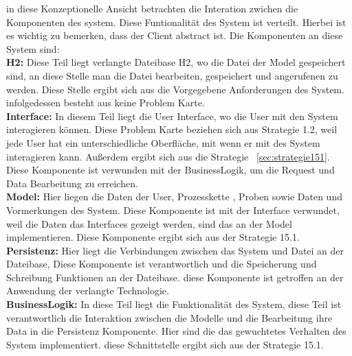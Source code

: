 \documentclass[enabledeprecatedfontcommands,fontsize=12pt,paper=a4,twoside]{scrartcl}
\begin{document}
in diese Konzeptionelle Ansicht betrachten die Interation zwichen die Komponenten des system. Diese Funtionalität des System ist verteilt. Hierbei ist es wichtig zu bemerken, dass der Client abstract ist. Die Komponenten an diese System sind: \\
\textbf{H2:} Diese Teil liegt verlangte Dateibase H2, wo die Datei der Model gespeichert sind, an diese Stelle man die Datei bearbeiten, gespeichert und angerufenen zu werden. Diese Stelle ergibt sich aus die Vorgegebene Anforderungen des System. infolgedessen besteht aus keine Problem Karte.\\
\textbf{Interface:} In diesem Teil liegt die User Interface, wo die User mit den System interagieren können. Diese Problem Karte beziehen sich aus Strategie 1.2, weil jede User hat ein unterschiedliche Oberfläche, mit wenn er mit des System interagieren kann. Außerdem ergibt sich aus die Strategie ~\ref{sec:strategie151}.
Diese Komponente ist verwunden mit der BusinessLogik, um die Request und Data Bearbeitung zu erreichen.\\
\textbf{Model:} Hier liegen die Daten der User, Prozesskette , Proben sowie Daten und Vormerkungen des System. Diese Komponente ist mit der Interface verwundet, weil die Daten das Interfaces gezeigt werden, sind das an der Model implementieren. Diese Komponente ergibt sich aus der Strategie 15.1. \\
\textbf{Persistenz:} Hier liegt die Verbindungen zwischen das System und Datei an der Dateibase, Diese Komponente ist verantwortlich und die Speicherung und Schreibung Funktionen an der Dateibase. diese Komponente  ist getroffen an der Anwendung der verlangte Technologie.  \\
\textbf{BusinessLogik:} In diese Teil liegt die Funktionalität des System, diese Teil ist verantwortlich die Interaktion zwischen die Modelle und die Bearbeitung ihre Data in die Persistenz Komponente. Hier sind die das gewuchtetes Verhalten des System implementiert. diese Schnittstelle ergibt sich aus der  Strategie 15.1.  \\
\end{document}
